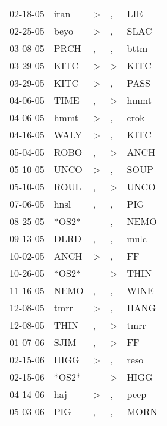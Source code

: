 \begin{supertabular}{lllll}
 02-18-05 &   iran &     \textgreater &                , &    LIE \\
 02-25-05 &   beyo &     \textgreater &                , &   SLAC \\
 03-08-05 &   PRCH &                , &                , &   bttm \\
 03-29-05 &   KITC &     \textgreater &     \textgreater &   KITC \\
 03-29-05 &   KITC &     \textgreater &                , &   PASS \\
 04-06-05 &   TIME &                , &     \textgreater &   hmmt \\
 04-06-05 &   hmmt &     \textgreater &                , &   crok \\
 04-16-05 &   WALY &     \textgreater &                , &   KITC \\
 05-04-05 &   ROBO &                , &     \textgreater &   ANCH \\
 05-10-05 &   UNCO &     \textgreater &                , &   SOUP \\
 05-10-05 &   ROUL &                , &     \textgreater &   UNCO \\
 07-06-05 &   hnsl &                , &                , &    PIG \\
 08-25-05 &  *OS2* &                  &                , &   NEMO \\
 09-13-05 &   DLRD &                , &                , &   mulc \\
 10-02-05 &   ANCH &     \textgreater &                , &     FF \\
 10-26-05 &  *OS2* &                  &     \textgreater &   THIN \\
 11-16-05 &   NEMO &                , &                , &   WINE \\
 12-08-05 &   tmrr &     \textgreater &                , &   HANG \\
 12-08-05 &   THIN &                , &     \textgreater &   tmrr \\
 01-07-06 &   SJIM &                , &     \textgreater &     FF \\
 02-15-06 &   HIGG &     \textgreater &                , &   reso \\
 02-15-06 &  *OS2* &                  &     \textgreater &   HIGG \\
 04-14-06 &    haj &     \textgreater &                , &   peep \\
 05-03-06 &    PIG &                , &                , &   MORN \\

\end{supertabular}
